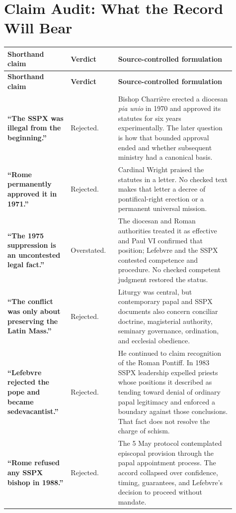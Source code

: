 \section{Claim Audit: What the Record Will Bear}

\begin{longtable}{>{\bfseries\RaggedRight\arraybackslash}p{0.25\linewidth}>{\RaggedRight\arraybackslash}p{0.19\linewidth}>{\RaggedRight\arraybackslash}p{0.47\linewidth}}
\toprule
\textbf{Shorthand claim} & \textbf{Verdict} & \textbf{Source-controlled formulation}\\
\midrule
\endfirsthead
\toprule
\textbf{Shorthand claim} & \textbf{Verdict} & \textbf{Source-controlled formulation}\\
\midrule
\endhead
\bottomrule
\endfoot
“The SSPX was illegal from the beginning.” & Rejected. & Bishop Charrière erected a diocesan \emph{pia unio} in 1970 and approved its statutes for six years experimentally. The later question is how that bounded approval ended and whether subsequent ministry had a canonical basis.\\
“Rome permanently approved it in 1971.” & Rejected. & Cardinal Wright praised the statutes in a letter. No checked text makes that letter a decree of pontifical-right erection or a permanent universal mission.\\
“The 1975 suppression is an uncontested legal fact.” & Overstated. & The diocesan and Roman authorities treated it as effective and Paul VI confirmed that position; Lefebvre and the SSPX contested competence and procedure. No checked competent judgment restored the status.\\
“The conflict was only about preserving the Latin Mass.” & Rejected. & Liturgy was central, but contemporary papal and SSPX documents also concern conciliar doctrine, magisterial authority, seminary governance, ordination, and ecclesial obedience.\\
“Lefebvre rejected the pope and became sedevacantist.” & Rejected. & He continued to claim recognition of the Roman Pontiff. In 1983 SSPX leadership expelled priests whose positions it described as tending toward denial of ordinary papal legitimacy and enforced a boundary against those conclusions. That fact does not resolve the charge of schism.\\
“Rome refused any SSPX bishop in 1988.” & Rejected. & The 5 May protocol contemplated episcopal provision through the papal appointment process. The accord collapsed over confidence, timing, guarantees, and Lefebvre's decision to proceed without mandate.\\

\end{longtable}
